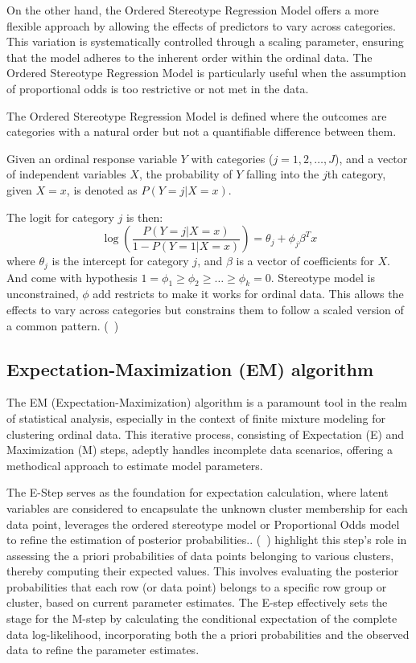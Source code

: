 \documentclass{article}
\begin{document}
On the other hand, the Ordered Stereotype Regression Model offers a more flexible approach by allowing the effects of predictors to vary across categories. This variation is systematically controlled through a scaling parameter, ensuring that the model adheres to the inherent order within the ordinal data. The Ordered Stereotype Regression Model is particularly useful when the assumption of proportional odds is too restrictive or not met in the data.

The Ordered Stereotype Regression Model is defined where the outcomes are categories with a natural order but not a quantifiable difference between them.

Given an ordinal response variable $Y$ with categories ($j=1, 2, \ldots, J$), and a vector of independent variables $X$, the probability of $Y$ falling into the $j$th category, given $X = x$, is denoted as $P(Y = j | X = x)$.


The logit for category $j$ is then:
\[
\log\left(\frac{P(Y = j | X = x)}{1 - P(Y = 1 | X = x)}\right) = \theta_j + \phi_j \beta^T x
\]
where $\theta_j$ is the intercept for category $j$, and $\beta$ is a vector of coefficients for $X$.
And come with hypothesis
$1 = \phi_1 \geq \phi_2 \geq \ldots \geq \phi_k = 0.$
Stereotype model is unconstrained, $\phi$ add restricts to make it works for ordinal data.
This allows the effects to vary across categories but constrains them to follow a scaled version of a common pattern. (~\cite{anderson1984regression})



\subsection{Expectation-Maximization (EM) algorithm}

The EM (Expectation-Maximization) algorithm is a paramount tool in the realm of statistical analysis, especially in the context of finite mixture modeling for clustering ordinal data. This iterative process, consisting of Expectation (E) and Maximization (M) steps, adeptly handles incomplete data scenarios, offering a methodical approach to estimate model parameters.

The E-Step serves as the foundation for expectation calculation, where latent variables are considered to encapsulate the unknown cluster membership for each data point, leverages the ordered stereotype model or Proportional Odds model to refine the estimation of posterior probabilities.. (~\cite{fernandez2016mixture}) highlight this step's role in assessing the a priori probabilities of data points belonging to various clusters, thereby computing their expected values. This involves evaluating the posterior probabilities that each row (or data point) belongs to a specific row group or cluster, based on current parameter estimates. The E-step effectively sets the stage for the M-step by calculating the conditional expectation of the complete data log-likelihood, incorporating both the a priori probabilities and the observed data to refine the parameter estimates.
\end{document}

